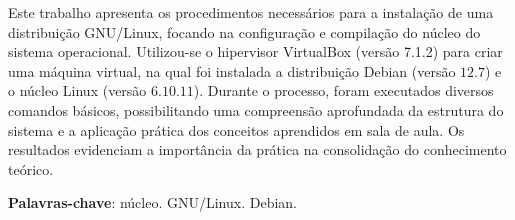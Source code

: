 \documentclass[
	12pt,				%
	oneside,   	        %
	a4paper,			%
	english,			%
	french,				%
	spanish,			%
	brazil,				%
	]{pacotes/abntex2}
\begin{document}
\frenchspacing 



\imprimirfolhaderosto



\begin{resumo}
Este trabalho apresenta os procedimentos necessários para a instalação de uma distribuição GNU/Linux, focando na configuração e compilação do núcleo do sistema operacional. Utilizou-se o hipervisor VirtualBox (versão 7.1.2) para criar uma máquina virtual, na qual foi instalada a distribuição Debian (versão $12.7$) e o núcleo Linux (versão $6.10.11$). Durante o processo, foram executados diversos comandos básicos, possibilitando uma compreensão aprofundada da estrutura do sistema e a aplicação prática dos conceitos aprendidos em sala de aula. Os resultados evidenciam a importância da prática na consolidação do conhecimento teórico.

 \vspace{\onelineskip}
    
 \noindent
 \textbf{Palavras-chave}: núcleo. GNU/Linux. Debian.
\end{resumo}




\tableofcontents*
\cleardoublepage

\textual
\end{document}
